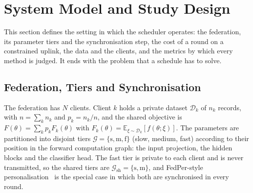 \documentclass[journal]{IEEEtran}
\begin{document}
\section{System Model and Study Design}
\label{sec:system}
This section defines the setting in which the scheduler operates: the federation, its parameter tiers and the synchronisation step, the cost of a round on a constrained uplink, the data and the clients, and the metrics by which every method is judged. It ends with the problem that a schedule has to solve.

\subsection{Federation, Tiers and Synchronisation}
\label{sec:federation}
The federation has $N$ clients. Client $k$ holds a private dataset $\mathcal D_k$ of $n_k$ records, with $n=\sum_kn_k$ and $p_k=n_k/n$, and the shared objective is $F(\theta)=\sum_kp_kF_k(\theta)$ with $F_k(\theta)=\mathbb E_{\xi\sim\mathcal D_k}[f(\theta;\xi)]$. The parameters are partitioned into disjoint tiers $\mathcal G=\{\mathrm s,\mathrm m,\mathrm f\}$ (slow, medium, fast) according to their position in the forward computation graph: the input projection, the hidden blocks and the classifier head. The fast tier is private to each client and is never transmitted, so the shared tiers are $\mathcal G_{\mathrm{sh}}=\{\mathrm s,\mathrm m\}$, and FedPer-style personalisation~\cite{arivazhagan2019} is the special case in which both are synchronised in every round.
\end{document}
